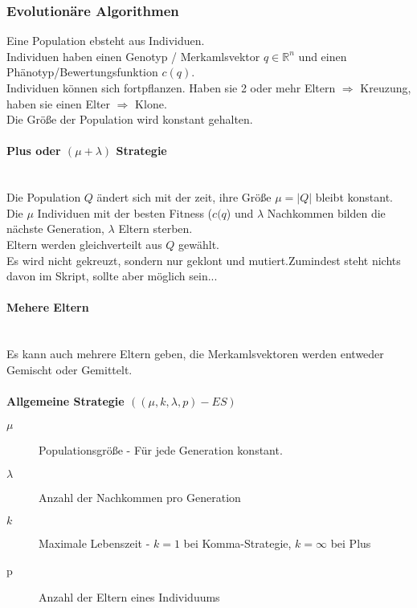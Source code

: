 \subsubsection{Evolutionäre Algorithmen}
Eine Population ebsteht aus Individuen.\\
Individuen haben einen Genotyp / Merkamlsvektor $q \in \mathbb{R}^n$ und einen Phänotyp/Bewertungsfunktion $c(q)$.\\
Individuen können sich fortpflanzen. Haben sie 2 oder mehr Eltern $\Rightarrow$ Kreuzung, haben sie einen Elter $\Rightarrow$ Klone.\\
Die Größe der Population wird konstant gehalten.\\

\paragraph{Plus oder $(\mu + \lambda)$ Strategie}
\text{ }\\Die Population $Q$ ändert sich mit der zeit, ihre Größe $\mu = |Q|$ bleibt konstant.\\
Die $\mu$ Individuen mit der besten Fitness ($c(q$) und $\lambda$ Nachkommen bilden die nächste Generation, $\lambda$ Eltern sterben.\\
Eltern werden gleichverteilt aus $Q$ gewählt.\\
Es wird nicht gekreuzt, sondern nur geklont und mutiert.Zumindest steht nichts davon im Skript, sollte aber möglich sein...\\

\paragraph{Mehere Eltern}
\text{ }\\Es kann auch mehrere Eltern geben, die Merkamlsvektoren werden entweder Gemischt oder Gemittelt.\\


\paragraph{Allgemeine Strategie $((\mu, k, \lambda, p) - ES)$}
\begin{description}
\item[$\mu$] Populationsgröße - Für jede Generation konstant.
\item[$\lambda$] Anzahl der Nachkommen pro Generation
\item[$k$] Maximale Lebenszeit - $k = 1$ bei Komma-Strategie, $k=\infty$ bei Plus
\item[p] Anzahl der Eltern eines Individuums
\end{description}

